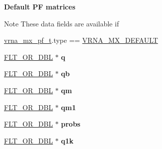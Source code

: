 \begin{Indent}{\bf Default P\-F matrices}\par
{\em \begin{DoxyNote}{Note}
These data fields are available if 
\begin{DoxyCode}
\hyperlink{group__dp__matrices_structvrna__mx__pf__s}{vrna\_mx\_pf\_t}.type == \hyperlink{group__dp__matrices_gga6042ea1d58d01931e959791be6d89343aafa2568956dab79595521e20c49a5f75}{VRNA\_MX\_DEFAULT} 
\end{DoxyCode}
 
\end{DoxyNote}
}\begin{DoxyCompactItemize}
\item 
\hypertarget{group__dp__matrices_a033a0277ac33736256c6a13f13d75879}{\hyperlink{group__data__structures_ga31125aeace516926bf7f251f759b6126}{F\-L\-T\-\_\-\-O\-R\-\_\-\-D\-B\-L} $\ast$ {\bfseries q}}\label{group__dp__matrices_a033a0277ac33736256c6a13f13d75879}

\item 
\hypertarget{group__dp__matrices_abd5ea8aa63458625d0c8b2a868fcfa28}{\hyperlink{group__data__structures_ga31125aeace516926bf7f251f759b6126}{F\-L\-T\-\_\-\-O\-R\-\_\-\-D\-B\-L} $\ast$ {\bfseries qb}}\label{group__dp__matrices_abd5ea8aa63458625d0c8b2a868fcfa28}

\item 
\hypertarget{group__dp__matrices_a612e774309a7fd0b6812200aa31f87d5}{\hyperlink{group__data__structures_ga31125aeace516926bf7f251f759b6126}{F\-L\-T\-\_\-\-O\-R\-\_\-\-D\-B\-L} $\ast$ {\bfseries qm}}\label{group__dp__matrices_a612e774309a7fd0b6812200aa31f87d5}

\item 
\hypertarget{group__dp__matrices_ad60e1fd6fa490ae72cdd899c37a52165}{\hyperlink{group__data__structures_ga31125aeace516926bf7f251f759b6126}{F\-L\-T\-\_\-\-O\-R\-\_\-\-D\-B\-L} $\ast$ {\bfseries qm1}}\label{group__dp__matrices_ad60e1fd6fa490ae72cdd899c37a52165}

\item 
\hypertarget{group__dp__matrices_aee4b900811aa012ab135838e2e5868f2}{\hyperlink{group__data__structures_ga31125aeace516926bf7f251f759b6126}{F\-L\-T\-\_\-\-O\-R\-\_\-\-D\-B\-L} $\ast$ {\bfseries probs}}\label{group__dp__matrices_aee4b900811aa012ab135838e2e5868f2}

\item 
\hypertarget{group__dp__matrices_a6ee76a2c5cefd1a9d6addf0a32071124}{\hyperlink{group__data__structures_ga31125aeace516926bf7f251f759b6126}{F\-L\-T\-\_\-\-O\-R\-\_\-\-D\-B\-L} $\ast$ {\bfseries q1k}}\label{group__dp__matrices_a6ee76a2c5cefd1a9d6addf0a32071124}


\end{DoxyCompactItemize}
\end{Indent}
